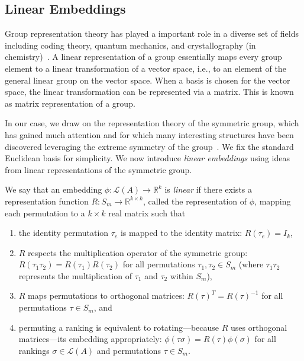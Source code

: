 \documentclass[prodmode]{acmsmall-ec14}
\newcommand{\calL}{{\mathcal{L}}}
\newcommand{\rank}{{\calL(A)}}
\begin{document}
\subsection{Linear Embeddings}
\label{sec:linear}

Group representation theory has played a important role in a diverse set of fields including %
coding theory, quantum mechanics, and crystallography (in chemistry)~\cite{BR86,KHS93,MS77}. A linear representation of a group essentially maps every group element to a linear transformation of a vector space, i.e., to an element of the general linear group on the vector space. When a basis is chosen for the vector space, the linear transformation can be represented via a matrix. This is known as matrix representation of a group. 

In our case, we draw on the representation theory of the symmetric group, which has gained much attention and for which many interesting structures have been discovered leveraging the extreme symmetry of the group~\cite{JKCR84}. We fix the standard Euclidean basis for simplicity. We now introduce \emph{linear embeddings} using ideas from linear representations of the symmetric group. 


\begin{definition}
We say that an embedding $\phi:\rank \rightarrow \mathbb{R}^k$ is \emph{linear} if there exists a representation function $R : S_m \rightarrow \mathbb{R}^{k \times k}$, called the representation of $\phi$, mapping each permutation to a $k \times k$ real matrix such that 
\begin{enumerate}
\item the identity permutation $\tau_e$ is mapped to the identity matrix: $R(\tau_e) = I_k$,
\item $R$ respects the multiplication operator of the symmetric group: $R(\tau_1 \tau_2) = R(\tau_1) R(\tau_2)$ for all permutations $\tau_1,\tau_2 \in S_m$ (where $\tau_1 \tau_2$ represents the multiplication of $\tau_1$ and $\tau_2$ within $S_m$), 
\item $R$ maps permutations to orthogonal matrices: $R(\tau)^T = R(\tau)^{-1}$ for all permutations $\tau \in S_m$, and
\item permuting a ranking is equivalent to rotating---because $R$ uses orthogonal matrices---its embedding appropriately: $\phi(\tau \sigma) = R(\tau) \phi(\sigma)$ for all rankings $\sigma \in \rank$ and permutations $\tau \in S_m$.
\end{enumerate}
\end{definition}
\end{document}
